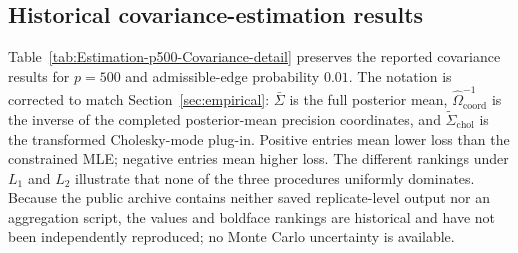 \documentclass[12pt]{article}
\theoremstyle{plain}
\theoremstyle{definition}
\theoremstyle{remark}
\begin{document}
\subsection*{Historical covariance-estimation results}\label{sec:suppCov}

Table~\ref{tab:Estimation-p500-Covariance-detail} preserves the reported
covariance results for $p=500$ and admissible-edge probability $0.01$.
The notation is corrected to match Section~\ref{sec:empirical}:
$\bar\Sigma$ is the full posterior mean,
$\widehat\Omega_{\mathrm{coord}}^{-1}$ is the inverse of the completed
posterior-mean precision coordinates, and
$\widetilde\Sigma_{\mathrm{chol}}$ is the transformed Cholesky-mode plug-in.
Positive entries mean lower loss than the constrained MLE; negative entries
mean higher loss.  The different rankings under $L_1$ and $L_2$ illustrate
that none of the three procedures uniformly dominates.  Because the public
archive contains neither saved replicate-level output nor an aggregation
script, the values and boldface rankings are historical and have not been
independently reproduced; no Monte Carlo uncertainty is available.
\end{document}
